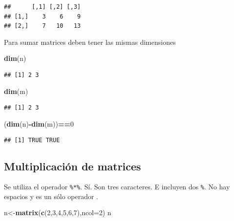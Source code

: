 \documentclass[
]{book}
\newenvironment{Shaded}{\begin{snugshade}}{\end{snugshade}}
\newcommand{\AttributeTok}[1]{\textcolor[rgb]{0.13,0.29,0.53}{#1}}
\newcommand{\DecValTok}[1]{\textcolor[rgb]{0.00,0.00,0.81}{#1}}
\newcommand{\FunctionTok}[1]{\textcolor[rgb]{0.13,0.29,0.53}{\textbf{#1}}}
\newcommand{\NormalTok}[1]{#1}
\newcommand{\OtherTok}[1]{\textcolor[rgb]{0.56,0.35,0.01}{#1}}
\newcommand{\SpecialCharTok}[1]{\textcolor[rgb]{0.81,0.36,0.00}{\textbf{#1}}}
\begin{document}
\begin{verbatim}
##      [,1] [,2] [,3]
## [1,]    3    6    9
## [2,]    7   10   13
\end{verbatim}

Para sumar matrices deben tener las mismas dimensiones

\begin{Shaded}
\begin{Highlighting}[]
\FunctionTok{dim}\NormalTok{(n)}
\end{Highlighting}
\end{Shaded}

\begin{verbatim}
## [1] 2 3
\end{verbatim}

\begin{Shaded}
\begin{Highlighting}[]
\FunctionTok{dim}\NormalTok{(m)}
\end{Highlighting}
\end{Shaded}

\begin{verbatim}
## [1] 2 3
\end{verbatim}

\begin{Shaded}
\begin{Highlighting}[]
\NormalTok{(}\FunctionTok{dim}\NormalTok{(n)}\SpecialCharTok{{-}}\FunctionTok{dim}\NormalTok{(m))}\SpecialCharTok{==}\DecValTok{0}
\end{Highlighting}
\end{Shaded}

\begin{verbatim}
## [1] TRUE TRUE
\end{verbatim}

\subsection{Multiplicación de matrices}\label{multiplicaciuxf3n-de-matrices}

Se utiliza el operador \texttt{\%*\%}. Sí. Son tres caracteres. E incluyen dos \texttt{\%}.
No hay espacios y es un sólo operador .

\begin{Shaded}
\begin{Highlighting}[]
\NormalTok{n}\OtherTok{\textless{}{-}}\FunctionTok{matrix}\NormalTok{(}\FunctionTok{c}\NormalTok{(}\DecValTok{2}\NormalTok{,}\DecValTok{3}\NormalTok{,}\DecValTok{4}\NormalTok{,}\DecValTok{5}\NormalTok{,}\DecValTok{6}\NormalTok{,}\DecValTok{7}\NormalTok{),}\AttributeTok{ncol=}\DecValTok{2}\NormalTok{)}
\NormalTok{n}
\end{Highlighting}
\end{Shaded}
\end{document}
